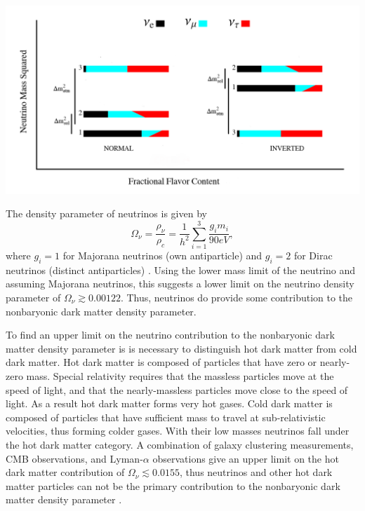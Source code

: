 \documentclass[a4paper,12pt]{article}
\begin{document}
\begin{center}
\includegraphics[scale=0.4]{neutrinos.png}
\end{center}


The density parameter of neutrinos is given by
\[\Omega_\nu=\frac{\rho_\nu}{\rho_c}=\frac{1}{h^2}\sum_{i=1}^3 \frac{g_i m_i}{90eV},\]
where $g_i = 1$ for Majorana neutrinos (own antiparticle) and $g_i = 2$ for Dirac neutrinos (distinct antiparticles) \cite{Pastor}. Using the lower mass limit of the neutrino and assuming Majorana neutrinos, this suggests a lower limit on the neutrino density parameter of $\Omega_\nu \gtrsim 0.00122$.  Thus, neutrinos do provide some contribution to the nonbaryonic dark matter density parameter.  

To find an upper limit on the neutrino contribution to the nonbaryonic dark matter density parameter is is necessary to distinguish hot dark matter from cold dark matter.  Hot dark matter is composed of particles that have zero or nearly-zero mass.  Special relativity requires that the massless particles move at the speed of light, and that the nearly-massless particles move close to the speed of light.  As a result hot dark matter forms very hot gases.  Cold dark matter is composed of particles that have sufficient mass to travel at sub-relativistic velocities, thus forming colder gases.  With their low masses neutrinos fall under the hot dark matter category.  A combination of galaxy clustering measurements, CMB observations, and Lyman-$\alpha$ observations give an upper limit on the hot dark matter contribution of $\Omega_\nu \lesssim 0.0155$, thus neutrinos and other hot dark matter particles can not be the primary contribution to the nonbaryonic dark matter density parameter \cite{Spergel}.
\end{document}
